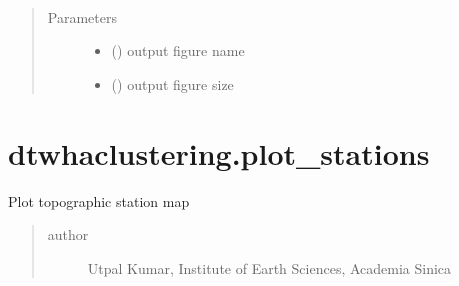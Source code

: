 \documentclass[letterpaper,10pt,english]{sphinxmanual}
\begin{document}
\begin{fulllineitems}
\label{\detokenize{modules/dtw_analysis:dtwhaclustering.dtw_analysis.shuffle_signals}}~\begin{quote}\begin{description}
\item[{Parameters}] \leavevmode\begin{itemize}
\item {} 
\sphinxAtStartPar
{} () \textendash{} output figure name

\item {} 
\sphinxAtStartPar
{} () \textendash{} output figure size

\end{itemize}

\end{description}\end{quote}

\end{fulllineitems}



\chapter{dtwhaclustering.plot\_stations}
\label{\detokenize{modules/plot_stations:module-dtwhaclustering.plot_stations}}\label{\detokenize{modules/plot_stations:dtwhaclustering-plot-stations}}\label{\detokenize{modules/plot_stations::doc}}
\sphinxAtStartPar
Plot topographic station map
\begin{quote}\begin{description}
\item[{author}] \leavevmode
\sphinxAtStartPar
Utpal Kumar, Institute of Earth Sciences, Academia Sinica

\end{description}\end{quote}
\end{document}
